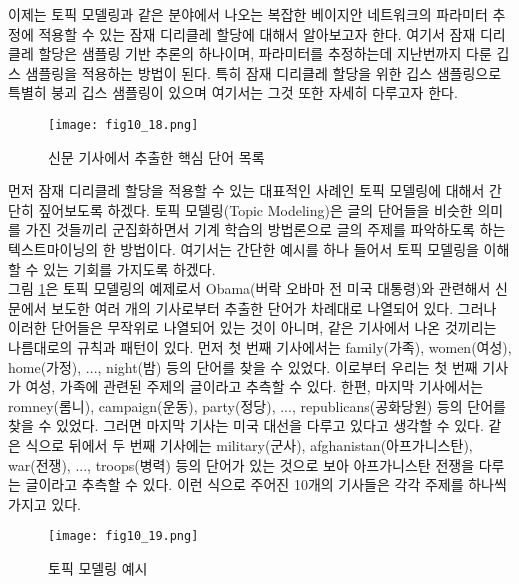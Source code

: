 \documentclass[a4paper]{oblivoir}
\begin{document}
이제는 토픽 모델링과 같은 분야에서 나오는 복잡한 베이지안 네트워크의 파라미터 추정에 적용할 수 있는 잠재 디리클레 할당에 대해서 알아보고자 한다. 여기서 잠재 디리클레 할당은 샘플링 기반 추론의 하나이며, 파라미터를 추정하는데 지난번까지 다룬 깁스 샘플링을 적용하는 방법이 된다. 특히 잠재 디리클레 할당을 위한 깁스 샘플링으로 특별히 붕괴 깁스 샘플링이 있으며 여기서는 그것 또한 자세히 다루고자 한다. \\

\begin{figure}[ht] \centering 
\texttt{[image: fig10\_18.png]} 
\caption{신문 기사에서 추출한 핵심 단어 목록}
\label{fig:10-18-1}
\end{figure}

먼저 잠재 디리클레 할당을 적용할 수 있는 대표적인 사례인 토픽 모델링에 대해서 간단히 짚어보도록 하겠다. 토픽 모델링(Topic Modeling)은  글의 단어들을 비슷한 의미를 가진 것들끼리 군집화하면서 기계 학습의 방법론으로 글의 주제를 파악하도록 하는 텍스트마이닝의 한 방법이다. 여기서는 간단한 예시를 하나 들어서 토픽 모델링을 이해할 수 있는 기회를 가지도록 하겠다. \\

그림 \ref{fig:10-18-1}은 토픽 모델링의 예제로서 Obama(버락 오바마 전 미국 대통령)와 관련해서 신문에서 보도한 여러 개의 기사로부터 추출한 단어가 차례대로 나열되어 있다. 그러나 이러한 단어들은 무작위로 나열되어 있는 것이 아니며, 같은 기사에서 나온 것끼리는 나름대로의 규칙과 패턴이 있다. 먼저 첫 번째 기사에서는 family(가족), women(여성), home(가정), ..., night(밤) 등의 단어를 찾을 수 있었다. 이로부터 우리는 첫 번째 기사가 여성, 가족에 관련된 주제의 글이라고 추측할 수 있다. 한편, 마지막 기사에서는 romney(롬니), campaign(운동), party(정당), ..., republicans(공화당원) 등의 단어를 찾을 수 있었다. 그러면 마지막 기사는 미국 대선을 다루고 있다고 생각할 수 있다. 같은 식으로 뒤에서 두 번째 기사에는 military(군사), afghanistan(아프가니스탄), war(전쟁), ..., troops(병력) 등의 단어가 있는 것으로 보아 아프가니스탄 전쟁을 다루는 글이라고 추측할 수 있다. 이런 식으로 주어진 10개의 기사들은 각각 주제를 하나씩 가지고 있다. \\

\begin{figure}[ht] \centering 
\texttt{[image: fig10\_19.png]} 
\caption{토픽 모델링 예시}
\label{fig:10-19}
\end{figure}
\end{document}
